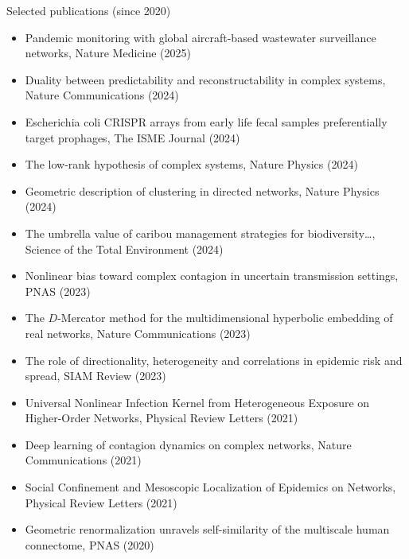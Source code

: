 \documentclass[10pt]{article}
\begin{document}
\vspace*{0\baselineskip}
\begin{minipage}[t]{\textwidth}
  {\large\color{monbleu}Selected publications (since 2020)}
  \begin{itemize}\small
    \item Pandemic monitoring with global aircraft-based wastewater surveillance networks, Nature Medicine (2025)
    \item Duality between predictability and reconstructability in complex systems, Nature Communications (2024)
    \item Escherichia coli CRISPR arrays from early life fecal samples preferentially target prophages, The ISME Journal (2024)
    \item The low-rank hypothesis of complex systems, Nature Physics (2024)
    \item Geometric description of clustering in directed networks, Nature Physics (2024)
    \item The umbrella value of caribou management strategies for biodiversity\ldots, Science of the Total Environment (2024)
    \item Nonlinear bias toward complex contagion in uncertain transmission settings, PNAS (2023)
    \item The $D$-Mercator method for the multidimensional hyperbolic embedding of real networks, Nature Communications (2023)
    \item The role of directionality, heterogeneity and correlations in epidemic risk and spread, SIAM Review (2023)
    \item Universal Nonlinear Infection Kernel from Heterogeneous Exposure on Higher-Order Networks, Physical Review Letters (2021)
    \item Deep learning of contagion dynamics on complex networks, Nature Communications (2021)
    \item Social Confinement and Mesoscopic Localization of Epidemics on Networks, Physical Review Letters (2021)
    \item Geometric renormalization unravels self-similarity of the multiscale human connectome, PNAS (2020)
  \end{itemize}
\end{minipage}
\end{document}
